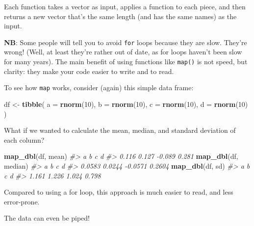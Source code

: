 \documentclass[]{book}
\newenvironment{Shaded}{\begin{snugshade}}{\end{snugshade}}
\newcommand{\KeywordTok}[1]{\textcolor[rgb]{0.13,0.29,0.53}{\textbf{#1}}}
\newcommand{\DataTypeTok}[1]{\textcolor[rgb]{0.13,0.29,0.53}{#1}}
\newcommand{\DecValTok}[1]{\textcolor[rgb]{0.00,0.00,0.81}{#1}}
\newcommand{\StringTok}[1]{\textcolor[rgb]{0.31,0.60,0.02}{#1}}
\newcommand{\CommentTok}[1]{\textcolor[rgb]{0.56,0.35,0.01}{\textit{#1}}}
\newcommand{\OperatorTok}[1]{\textcolor[rgb]{0.81,0.36,0.00}{\textbf{#1}}}
\newcommand{\NormalTok}[1]{#1}
\begin{document}
Each function takes a vector as input, applies a function to each piece,
and then returns a new vector that's the same length (and has the same
names) as the input.

\textbf{NB}: Some people will tell you to avoid \texttt{for} loops
because they are slow. They're wrong! (Well, at least they're rather out
of date, as for loops haven't been slow for many years). The main
benefit of using functions like \texttt{map()} is not speed, but
clarity: they make your code easier to write and to read.

To see how \texttt{map} works, consider (again) this simple data frame:

\begin{Shaded}
\begin{Highlighting}[]
\NormalTok{df <-}\StringTok{ }\KeywordTok{tibble}\NormalTok{(}
  \DataTypeTok{a =} \KeywordTok{rnorm}\NormalTok{(}\DecValTok{10}\NormalTok{),}
  \DataTypeTok{b =} \KeywordTok{rnorm}\NormalTok{(}\DecValTok{10}\NormalTok{),}
  \DataTypeTok{c =} \KeywordTok{rnorm}\NormalTok{(}\DecValTok{10}\NormalTok{),}
  \DataTypeTok{d =} \KeywordTok{rnorm}\NormalTok{(}\DecValTok{10}\NormalTok{)}
\NormalTok{)}
\end{Highlighting}
\end{Shaded}

What if we wanted to calculate the mean, median, and standard deviation
of each column?

\begin{Shaded}
\begin{Highlighting}[]
\KeywordTok{map_dbl}\NormalTok{(df, mean)}
\CommentTok{#>      a      b      c      d }
\CommentTok{#>  0.116  0.127 -0.089  0.281}
\KeywordTok{map_dbl}\NormalTok{(df, median)}
\CommentTok{#>       a       b       c       d }
\CommentTok{#>  0.0583  0.0244 -0.0571  0.2604}
\KeywordTok{map_dbl}\NormalTok{(df, sd)}
\CommentTok{#>     a     b     c     d }
\CommentTok{#> 1.161 1.226 1.024 0.798}
\end{Highlighting}
\end{Shaded}

Compared to using a for loop, this approach is much easier to read, and
less error-prone.

The data can even be piped!

\begin{Shaded}
\end{Shaded}
\end{document}
